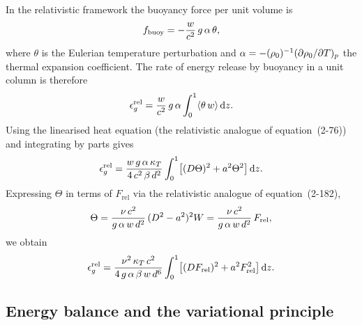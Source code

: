 In the relativistic framework the buoyancy force per unit volume is
\begin{equation}
\label{eq:rel-buoy-force}
f_{\mathrm{buoy}}
= -\frac{w}{c^2}\,g\,\alpha\,\theta,
\end{equation}
where $\theta$ is the Eulerian temperature perturbation and
$\alpha = -(\rho_0)^{-1}(\partial\rho_0/\partial T)_p$ the
thermal expansion coefficient.  The rate of energy release by buoyancy
in a unit column is therefore
\begin{equation}
\label{eq:rel-2-179}
\epsilon_g^{\mathrm{rel}}
= \frac{w}{c^2}\,g\,\alpha
\int_0^1 \langle\theta\,w\rangle\,\mathrm{d}z.
\end{equation}
Using the linearised heat equation (the relativistic analogue of
equation~(2-76)) and integrating by parts gives
\begin{equation}
\label{eq:rel-2-181}
\epsilon_g^{\mathrm{rel}}
= \frac{w\,g\,\alpha\,\kappa_T}
       {4\,c^2\,\beta\,d^2}
\int_0^1 \bigl[(D\Theta)^2 + a^2\Theta^2\bigr]\,\mathrm{d}z.
\end{equation}
Expressing $\Theta$ in terms of $F_{\mathrm{rel}}$ via the
relativistic analogue of equation~(2-182),
\begin{equation}
\label{eq:rel-2-182}
\Theta = \frac{\nu\,c^2}{g\,\alpha\,w\,d^2}\,
(D^2-a^2)^2 W
= \frac{\nu\,c^2}{g\,\alpha\,w\,d^2}\,F_{\mathrm{rel}},
\end{equation}
we obtain
\begin{equation}
\label{eq:rel-2-183}
\epsilon_g^{\mathrm{rel}}
= \frac{\nu^2\,\kappa_T\,c^2}
       {4\,g\,\alpha\,\beta\,w\,d^6}
\int_0^1 \bigl[(DF_{\mathrm{rel}})^2
  + a^2 F_{\mathrm{rel}}^2\bigr]\,\mathrm{d}z.
\end{equation}

\subsection{Energy balance and the variational principle}\label{sec:rel-14c}

